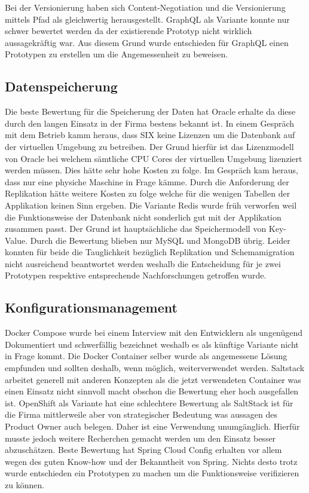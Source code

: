 Bei der Versionierung haben sich Content-Negotiation und die Versionierung mittels Pfad als gleichwertig herausgestellt. GraphQL als Variante konnte nur schwer bewertet werden da der existierende Prototyp nicht wirklich aussagekräftig war. Aus diesem Grund wurde entschieden für GraphQL einen Prototypen zu erstellen um die Angemessenheit zu beweisen.

\subsection{Datenspeicherung}

Die beste Bewertung für die Speicherung der Daten hat Oracle erhalte da diese durch den langen Einsatz in der Firma bestens bekannt ist. In einem Gespräch mit dem Betrieb kamm heraus, dass SIX keine Lizenzen um die Datenbank auf der virtuellen Umgebung zu betreiben. Der Grund hierfür ist das Lizenzmodell von Oracle bei welchem sämtliche CPU Cores der virtuellen Umgebung lizenziert werden müssen. Dies hätte sehr hohe Kosten zu folge. Im Gespräch kam heraus, dass nur eine physiche Maschine in Frage kämme. 
Durch die Anforderung der Replikation hätte weitere Kosten zu folge welche für die wenigen Tabellen der Applikation keinen Sinn ergeben.
Die Variante Redis wurde früh verworfen weil die Funktionsweise der Datenbank nicht sonderlich gut mit der Applikation zusammen passt. Der Grund ist hauptsächliche das Speichermodell von Key-Value.
Durch die Bewertung blieben nur MySQL und MongoDB übrig. Leider konnten für beide die Tauglichkeit bezüglich Replikation und Schemamigration nicht ausreichend beantwortet werden weshalb die Entscheidung für je zwei Prototypen respektive entsprechende Nachforschungen getroffen wurde.

\subsection{Konfigurationsmanagement}

Docker Compose wurde bei einem Interview mit den Entwicklern als ungenügend Dokumentiert und schwerfällig bezeichnet weshalb es als künftige Variante nicht in Frage kommt. Die Docker Container selber wurde als angemessene Lösung empfunden und sollten deshalb, wenn möglich, weiterverwendet werden. Saltstack arbeitet generell mit anderen Konzepten als die jetzt verwendeten Container was einen Einsatz nicht sinnvoll macht obschon die Bewertung eher hoch ausgefallen ist. OpenShift als Variante hat eine schlechtere Bewertung als SaltStack ist für die Firma mittlerweile aber von strategischer Bedeutung was aussagen des Product Owner auch belegen. Daher ist eine Verwendung unumgänglich. Hierfür musste jedoch weitere Recherchen gemacht werden um den Einsatz besser abzuschätzen. Beste Bewertung hat Spring Cloud Config erhalten vor allem wegen des guten Know-how und der Bekanntheit von Spring. Nichts desto trotz wurde entschieden ein Prototypen zu machen um die Funktionsweise verifizieren zu können.

